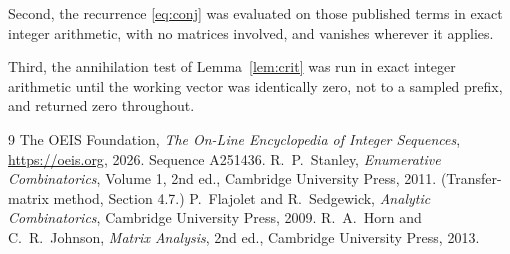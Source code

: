 \documentclass[11pt,a4paper]{article}
\theoremstyle{plain}
\theoremstyle{definition}
\begin{document}
Second, the recurrence \eqref{eq:conj} was evaluated on those published terms in exact
integer arithmetic, with no matrices involved, and vanishes wherever it applies.

Third, the annihilation test of Lemma~\ref{lem:crit} was run in exact integer arithmetic
until the working vector was identically zero, not to a sampled prefix, and returned zero
throughout.

\begin{thebibliography}{9}
 The OEIS Foundation, \emph{The On-Line Encyclopedia of Integer
Sequences}, \url{https://oeis.org}, 2026. Sequence A251436.
 R.~P.~Stanley, \emph{Enumerative Combinatorics}, Volume 1, 2nd ed.,
Cambridge University Press, 2011. (Transfer-matrix method, Section 4.7.)
 P.~Flajolet and R.~Sedgewick, \emph{Analytic Combinatorics}, Cambridge
University Press, 2009.
 R.~A.~Horn and C.~R.~Johnson, \emph{Matrix Analysis}, 2nd ed., Cambridge
University Press, 2013.
\end{thebibliography}
\end{document}
